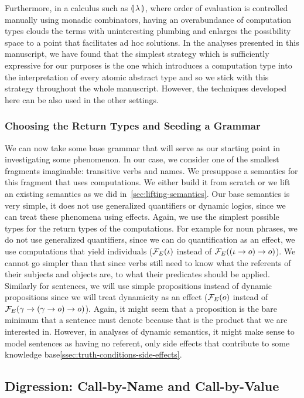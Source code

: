 Furthermore, in a calculus such as $\llparenthesis \, \lambda \, \rrparenthesis$, where order of
evaluation is controlled manually using monadic combinators, having an
overabundance of computation types clouds the terms with uninteresting
plumbing and enlarges the possibility space to a point that facilitates ad
hoc solutions. In the analyses presented in this manuscript, we have found
that the simplest strategy which is sufficiently expressive for our
purposes is the one which introduces a computation type into the
interpretation of every atomic abstract type and so we stick with this
strategy throughout the whole manuscript. However, the techniques developed
here can be also used in the other settings.


\subsubsection{Choosing the Return Types and Seeding a Grammar}

We can now take some base grammar that will serve as our starting point in
investigating some phenomenon. In our case, we consider one of the smallest
fragments imaginable: transitive verbs and names. We presuppose a semantics
for this fragment that uses computations. We either build it from scratch
or we lift an existing semantics as we did
in~\ref{sec:lifting-semantics}. Our base semantics is very simple, it does
not use generalized quantifiers or dynamic logics, since we can treat these
phenomena using effects. Again, we use the simplest possible types for the
return types of the computations. For example for noun phrases, we do not
use generalized quantifiers, since we can do quantification as an effect,
we use computations that yield individuals ($\mathcal{F}_E(\iota)$ instead of
$\mathcal{F}_E((\iota \to o) \to o)$). We cannot go simpler than that since verbs
still need to know what the referents of their subjects and objects are, to
what their predicates should be applied. Similarly for sentences, we will
use simple propositions instead of dynamic propositions since we will treat
dynamicity as an effect ($\mathcal{F}_E(o)$ instead of
$\mathcal{F}_E(\gamma \to (\gamma \to o) \to o)$). Again, it might seem that a
proposition is the bare minimum that a sentence must denote because that is
the product that we are interested in. However, in analyses of dynamic
semantics, it might make sense to model sentences as having no referent,
only side effects that contribute to some knowledge
base\ref{ssec:truth-conditions-side-effects}.


\subsection{Digression: Call-by-Name and Call-by-Value}
\label{ssec:cbn-and-cbv}

